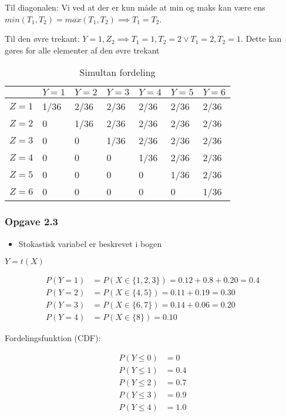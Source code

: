 Til diagonalen: Vi ved at der er kun måde at min og maks kan være ens $min(T_1,T_2) = max(T_1, T_2) \implies T_1 = T_2$.

Til den øvre trekant: $Y = 1, Z_2 \implies T_1 = 1, T_2 = 2 \lor T_1=2, T_2 = 1$. Dette kan gøres for alle elementer af den øvre trekant

\begin{table}[ht]
\label{tab:Y_Z_terning}
\centering
\caption{Simultan fordeling}
\begin{tabular}{|l|l|l|l|l|l|l|}
\hline
      & $Y = 1$ & $Y=2$ & $Y=3$ & $Y=4$ & $Y=5$ & $Y=6$ \\ \hline
$Z=1$ & 1/36    & 2/36  & 2/36  & 2/36  & 2/36  & 2/36  \\ \hline
$Z=2$ & 0       & 1/36  & 2/36  & 2/36  & 2/36  & 2/36  \\ \hline
$Z=3$ & 0       & 0     & 1/36  & 2/36  & 2/36  & 2/36  \\ \hline
$Z=4$ & 0       & 0     & 0     & 1/36  & 2/36  & 2/36  \\ \hline
$Z=5$ & 0       & 0     & 0     & 0     & 1/36  & 2/36  \\ \hline
$Z=6$ & 0       & 0     & 0     & 0     & 0     & 1/36  \\ \hline
\end{tabular}
\end{table}


\subsubsection{Opgave 2.3}

\begin{itemize}
    \item Stokastisk variabel er beskrevet i bogen
\end{itemize}

$Y=t(X)$

\begin{align}
    P(Y=1) &= P(X\in\{1,2,3\}) = 0.12 + 0.8 + 0.20 = 0.4 \\
    P(Y=2) &= P(X \in \{4,5\}) = 0.11 + 0.19 = 0.30 \\
    P(Y=3) &= P(X \in \{6,7\}) = 0.14 + 0.06 = 0.20 \\
    P(Y=4) &= P(X \in \{8\}) =0.10
\end{align}

Fordelingsfunktion (CDF):

\begin{align}
    P(Y \leq 0) &= 0 \\
    P(Y \leq 1) &= 0.4 \\
    P(Y \leq 2) &= 0.7 \\
    P(Y \leq 3) &= 0.9 \\
    P(Y \leq 4) &= 1.0 
\end{align}{}

